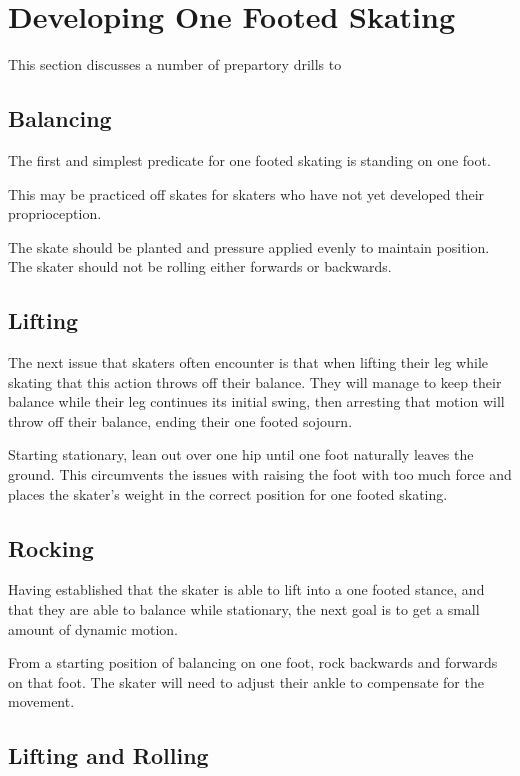 \section{Developing One Footed Skating}
\label{sec:one_foot/development}


This section discusses a number of prepartory drills to  


\subsection*{Balancing}
The first and simplest predicate for one footed skating is standing on one foot. 

This may be practiced off skates for skaters who have not yet developed their proprioception.    

The skate should be planted and pressure applied evenly to maintain position.   
The skater should not be rolling either forwards or backwards.

\subsection*{Lifting}
The next issue that skaters often encounter is that when lifting their leg while skating that this action throws off their balance.
They will manage to keep their balance while their leg continues its initial swing, then arresting that motion will throw off their balance, ending their one footed sojourn.  


Starting stationary, lean out over one hip until one foot naturally leaves the ground.
This circumvents the issues with raising the foot with too much force and places the skater's weight in the correct position for one footed skating.    


\subsection*{Rocking}

Having established that the skater is able to lift into a one footed stance, and that they are able to balance while stationary, the next goal is to get a small amount of dynamic motion. 

From a starting position of balancing on one foot, rock backwards and forwards on that foot. 
The skater will need to adjust their ankle to compensate for the movement.


\subsection*{Lifting and Rolling}


